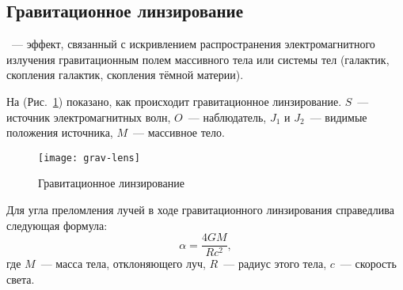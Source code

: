 \subsection{Гравитационное линзирование}

~--- эффект, связанный с искривлением распространения электромагнитного излучения гравитационным полем массивного тела или системы тел (галактик, скопления галактик, скопления тёмной материи).

На (Рис.~\ref{grav-lens}) показано, как происходит гравитационное линзирование. $S$~--- источник электромагнитных волн, $O$~--- наблюдатель, $J_1$ и $J_2$~--- видимые положения источника, $M$~--- массивное тело.

\begin{figure}[h!]
	\centering
	\texttt{[image: grav-lens]}
	\caption{Гравитационное линзирование}
	\label{grav-lens}
\end{figure}

Для угла преломления лучей в ходе гравитационного линзирования справедлива следующая формула: \begin{equation}
	\alpha = \frac{4 G M}{R c^2},
\end{equation}
где $M$~--- масса тела, отклоняющего луч, $R$~--- радиус этого тела, $c$~--- скорость света.